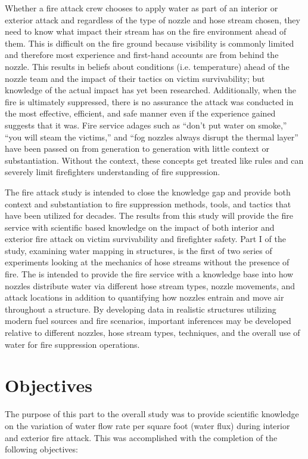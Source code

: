 \documentclass[12pt,oneside]{book}
\begin{document}
Whether a fire attack crew chooses to apply water as part of an interior or exterior attack and regardless of the type of nozzle and hose stream chosen, they need to know what impact their stream has on the fire environment ahead of them. This is difficult on the fire ground because visibility is commonly limited and therefore most experience and first-hand accounts are from behind the nozzle. This results in beliefs about conditions (i.e. temperature) ahead of the nozzle team and the impact of their tactics on victim survivability; but knowledge of the actual impact has yet been researched. Additionally, when the fire is ultimately suppressed, there is no assurance the attack was conducted in the most effective, efficient, and safe manner even if the experience gained suggests that it was. Fire service adages such as ``don't put water on smoke,'' ``you will steam the victims,'' and ``fog nozzles always disrupt the thermal layer'' have been passed on from generation to generation with little context or substantiation. Without the context, these concepts get treated like rules and can severely limit firefighters understanding of fire suppression.

The fire attack study is intended to close the knowledge gap and provide both context and substantiation to fire suppression methods, tools, and tactics that have been utilized for decades. The results from this study will provide the fire service with scientific based knowledge on the impact of both interior and exterior fire attack on victim survivability and firefighter safety. Part I of the study, examining water mapping in structures, is the first of two series of experiments looking at the mechanics of hose streams without the presence of fire. The is intended to provide the fire service with a knowledge base into how nozzles distribute water via different hose stream types, nozzle movements, and attack locations in addition to quantifying how nozzles entrain and move air throughout a structure. By developing data in realistic structures utilizing modern fuel sources and fire scenarios, important inferences may be developed relative to different nozzles, hose stream types, techniques, and the overall use of water for fire suppression operations.

\chapter{Objectives}

The purpose of this part to the overall study was to provide scientific knowledge on the variation of water flow rate per square foot (water flux) during interior and exterior fire attack. This was accomplished with the completion of the following objectives:
\end{document}
